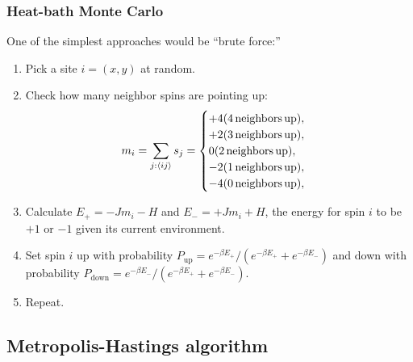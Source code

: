 \documentclass[hyperref={colorlinks=true}]{beamer}
\begin{document}
\begin{frame}%
  \frametitle{Heat-bath Monte Carlo}
  
  One of the simplest approaches would be ``brute force:''
  
  \begin{enumerate}
    \item Pick a site $i = (x,y)$ at random. 
    \item Check how many neighbor spins are pointing up:
    \begin{equation}
      m_i = \sum _{j:\langle ij \rangle} s_j = \begin{cases}
               +4  (\mathrm{4\, neighbors\, up}),\\
               +2  (\mathrm{3\, neighbors\, up}),\\
                0  (\mathrm{2\, neighbors\, up}),\\
               -2 (\mathrm{1\, neighbors\, up}),\\
               -4 (\mathrm{0\, neighbors\, up}),\\
            \end{cases}
    \end{equation}
    \item Calculate $E_{+} = - J m_i - H$ and $E_{-} = +J m_i + H$, the energy for spin $i$ to be $+1$ or $-1$ given its current environment.
    \item Set spin $i$ up with probability $P_{\mathrm{up}} = e^{-\beta E_{+}} / (e^{-\beta E_{+}} + e^{-\beta E_{-}})$ and down with probability $P_{\mathrm{down}} = e^{-\beta E_{-}} / (e^{-\beta E_{+}} + e^{-\beta E_{-}})$.
    \item Repeat.
  \end{enumerate}

\end{frame}

\subsection[Metropolis-Hastings algorithm]{Metropolis-Hastings algorithm}
\end{document}
